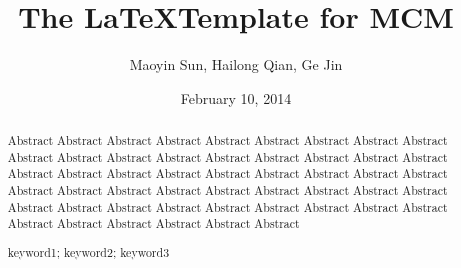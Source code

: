 \documentclass[a4paper,11pt]{article}
\title{The \LaTeX Template for MCM}
\author{\small {Maoyin Sun, Hailong Qian, Ge Jin}}
\date{February 10, 2014}
\begin{document}
\begin{abstract}
Abstract Abstract Abstract Abstract Abstract Abstract Abstract Abstract Abstract Abstract Abstract Abstract Abstract Abstract Abstract Abstract Abstract Abstract Abstract Abstract Abstract Abstract Abstract Abstract Abstract Abstract Abstract Abstract Abstract Abstract Abstract Abstract Abstract Abstract Abstract Abstract Abstract Abstract Abstract Abstract Abstract Abstract Abstract Abstract Abstract Abstract Abstract Abstract Abstract Abstract Abstract 
\begin{keywords}
keyword1; keyword2; keyword3
\end{keywords}
\end{abstract}

\maketitle
\pagestyle{empty}
%


\tableofcontents                                                  %
\newpage
\pagestyle{fancy}                                                     %

\end{document}
